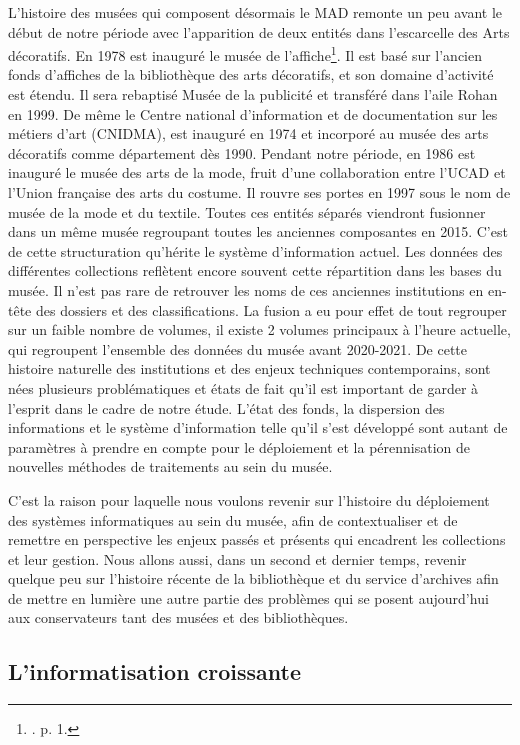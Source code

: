 L'histoire des musées qui composent désormais le MAD remonte un peu avant le début de notre période avec l'apparition de deux entités dans l'escarcelle des Arts décoratifs. En 1978 est inauguré le musée de l'affiche\footnote{\cite{siguret_ir_2001}. p. 1.}. Il est basé sur l'ancien fonds d'affiches de la bibliothèque des arts décoratifs, et son domaine d'activité est étendu. Il sera rebaptisé Musée de la publicité et transféré dans l'aile Rohan en 1999. De même le Centre national d'information et de documentation sur les métiers d'art (CNIDMA), est inauguré en 1974 et incorporé au musée des arts décoratifs comme département dès 1990. Pendant notre période, en 1986 est inauguré le musée des arts de la mode, fruit d'une collaboration entre l'UCAD et l'Union française des arts du costume. Il rouvre ses portes en 1997 sous le nom de musée de la mode et du textile. Toutes ces entités séparés viendront fusionner dans un même musée regroupant toutes les anciennes composantes en 2015. C'est de cette structuration qu'hérite le système d'information actuel. Les données des différentes collections reflètent encore souvent cette répartition dans les bases du musée. Il n'est pas rare de retrouver les noms de ces anciennes institutions en en-tête des dossiers et des classifications. La fusion a eu pour effet de tout regrouper sur un faible nombre de volumes, il existe 2 volumes principaux à l'heure actuelle, qui regroupent l'ensemble des données du musée avant 2020-2021. De cette histoire naturelle des institutions et des enjeux techniques contemporains, sont nées plusieurs problématiques et états de fait qu'il est important de garder à l'esprit dans le cadre de notre étude. L'état des fonds, la dispersion des informations et le système d'information telle qu'il s'est développé sont autant de paramètres à prendre en compte pour le déploiement et la pérennisation de nouvelles méthodes de traitements au sein du musée. 

C'est la raison pour laquelle nous voulons revenir sur l'histoire du déploiement des systèmes informatiques au sein du musée, afin de contextualiser et de remettre en perspective les enjeux passés et présents qui encadrent les collections et leur gestion. Nous allons aussi, dans un second et dernier temps, revenir quelque peu sur l'histoire récente de la bibliothèque et du service d'archives afin de mettre en lumière une autre partie des problèmes qui se posent aujourd'hui aux conservateurs tant des musées et des bibliothèques. 

\subsection{L'informatisation croissante}


